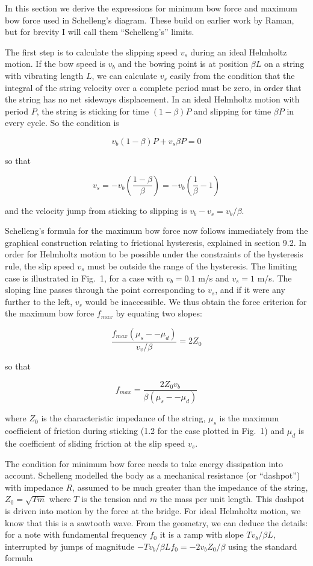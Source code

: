   In this section we derive the expressions for minimum bow force and maximum 
  bow force used in Schelleng's diagram. These build on earlier work by Raman, 
  but for brevity I will call them ``Schelleng's'' limits. 

  The first step is to calculate the slipping speed $v_s$ during an ideal 
  Helmholtz motion. If the bow speed is $v_b$ and the bowing point is at 
  position $\beta L$ on a string with vibrating length $L$, we can calculate 
  $v_s$ easily from the condition that the integral of the string velocity over 
  a complete period must be zero, in order that the string has no net sideways 
  displacement. In an ideal Helmholtz motion with period $P$, the string is 
  sticking for time $(1-\beta) P$ and slipping for time $\beta P$ in every 
  cycle. So the condition is 

  $$v_b (1-\beta) P + v_s \beta P = 0 \tag{1}$$ 

  so that 

  $$v_s=-v_b \left(\dfrac{1-\beta}{\beta} \right)=-v_b \left(\dfrac{1}{\beta} 
  -1 \right) \tag{2}$$ 

  and the velocity jump from sticking to slipping is $v_b-v_s = v_b/\beta$. 

  Schelleng's formula for the maximum bow force now follows immediately from 
  the graphical construction relating to frictional hysteresis, explained in 
  section 9.2. In order for Helmholtz motion to be possible under the 
  constraints of the hysteresis rule, the slip speed $v_s$ must be outside the 
  range of the hysteresis. The limiting case is illustrated in Fig.\ 1, for a 
  case with $v_b=0.1$ m/s and $v_s =1$ m/s. The sloping line passes through the 
  point corresponding to $v_s$, and if it were any further to the left, $v_s$ 
  would be inaccessible. We thus obtain the force criterion for the maximum bow 
  force $f_{max}$ by equating two slopes: 

  $$\dfrac{f_{max} (\mu_s -- \mu_d)}{v_v/\beta}=2 Z_0 \tag{3}$$ 

  so that 

  $$f_{max}=\dfrac{2Z_0 v_b}{\beta (\mu_s -- \mu_d)} \tag{4}$$ 

  where $Z_0$ is the characteristic impedance of the string, $\mu_s$ is the 
  maximum coefficient of friction during sticking (1.2 for the case plotted in 
  Fig.\ 1) and $\mu_d$ is the coefficient of sliding friction at the slip speed 
  $v_s$. 

  The condition for minimum bow force needs to take energy dissipation into 
  account. Schelleng modelled the body as a mechanical resistance (or 
  ``dashpot'') with impedance $R$, assumed to be much greater than the 
  impedance of the string, $Z_0 = \sqrt{Tm}$ where $T$ is the tension and $m$ 
  the mass per unit length. This dashpot is driven into motion by the force at 
  the bridge. For ideal Helmholtz motion, we know that this is a sawtooth wave. 
  From the geometry, we can deduce the details: for a note with fundamental 
  frequency $f_0$ it is a ramp with slope $Tv_b/\beta L$, interrupted by jumps 
  of magnitude $-Tv_b/\beta L f_0=-2v_b Z_0/\beta$ using the standard formula 

